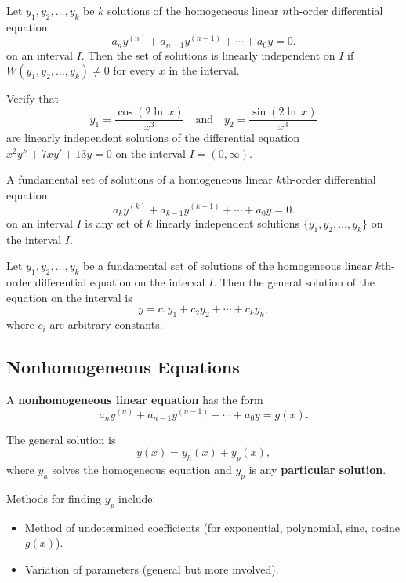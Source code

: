 \begin{theorem}
  Let \(y_1,y_2,\ldots,y_k\) be \(k\) solutions of the homogeneous linear \(n\)th-order differential equation
  \[
  a_n y^{(n)} + a_{n-1} y^{(n-1)} + \cdots + a_0 y = 0.
  \]
  on an interval \(I\).
  Then the set of solutions is linearly independent on \(I\) if \(W(y_1,y_2,\ldots,y_k)\neq 0\) for every \(x\) in the interval.
\end{theorem}


\begin{example}
  Verify that 
  \[
  y_1 = \frac{\cos{(2\ln\,x)}}{x^3} \quad \text{and} \quad y_2 = \frac{\sin{(2\ln\,x)}}{x^3}
  \]
  are linearly independent solutions of the differential equation \(x^2y'' + 7xy' + 13y = 0\) on the interval \(I = (0, \infty)\).
\end{example}


\begin{definition}
  A fundamental set of solutions of a homogeneous linear \(k\)th-order differential equation 
  \[
  a_k y^{(k)} + a_{k-1} y^{(k-1)} + \cdots + a_0 y = 0.
  \]
  on an interval \(I\) is any set of \(k\) linearly independent solutions \(\{y_1,y_2,\ldots,y_k\}\) on the interval \(I\).
\end{definition}


\begin{theorem}
   Let \(y_1,y_2,\ldots,y_k\) be a fundamental set of solutions of the homogeneous linear \(k\)th-order differential equation
   on the interval \(I\).
   Then the general solution of the equation on the interval is
   \[
   y = c_1y_1 + c_2y_2 + \cdots + c_ky_k,
   \]
   where \(c_i\) are arbitrary constants.
\end{theorem}




\subsection{Nonhomogeneous Equations}
A \textbf{nonhomogeneous linear equation} has the form
\[
a_n y^{(n)} + a_{n-1} y^{(n-1)} + \cdots + a_0 y = g(x).
\]

The general solution is
\[
y(x) = y_h(x) + y_p(x),
\]
where $y_h$ solves the homogeneous equation and $y_p$ is any \textbf{particular solution}.

Methods for finding $y_p$ include:
\begin{itemize}
    \item Method of undetermined coefficients (for exponential, polynomial, sine, cosine $g(x)$).
    \item Variation of parameters (general but more involved).
\end{itemize}


